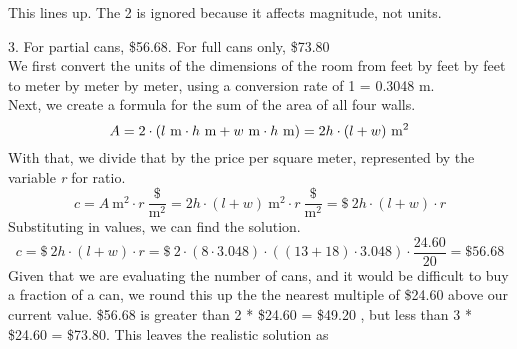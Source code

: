 \documentclass[12pt]{article}
\begin{document}
This lines up. The 2 is ignored because it affects magnitude, not units. \\
\pagebreak

3. For partial cans, \$56.68. For full cans only, \$73.80\\
We first convert the units of the dimensions of the room from feet by feet by feet to meter by meter by meter, using a conversion rate of 1 \unit{\foot} = 0.3048 \unit{\meter}.\\
Next, we create a formula for the sum of the area of all four walls.
\begin{equation*}
    A = 2 \cdot ( l\ \unit{\meter} \cdot h\ \unit{\meter} + w\ \unit{\meter} \cdot h\ \unit{\meter} ) = 2h \cdot ( l + w )\ \unit{\meter}^2 \\
\end{equation*}
With that, we divide that by the price per square meter, represented by the variable \textit{r} for ratio.
\begin{equation*}
    c = A\ \unit{\meter}^2 \cdot r\ \frac{\$}{\unit{\meter}^2} = 2h \cdot ( l + w )\ \unit{\meter}^2 \cdot r\ \frac{\$}{\unit{\meter}^2} = \$\ 2h \cdot ( l + w ) \cdot r
\end{equation*}
Substituting in values, we can find the solution.
\begin{equation*}
    c = \$\ 2h \cdot ( l + w ) \cdot r = \$\ 2 \cdot (8 \cdot 3.048) \cdot ((13 + 18) \cdot 3.048) \cdot \frac{24.60}{20}
    = \boxed{\$ 56.68}
\end{equation*}
Given that we are evaluating the number of cans, and it would be difficult to buy a fraction of a can, we round this up the the nearest multiple of \$24.60 above our current value. \$56.68 is greater than 2 * \$24.60 = \$49.20 , but less than 3 * \$24.60 = \$73.80. This leaves the realistic solution as 
\\
\pagebreak
\end{document}
